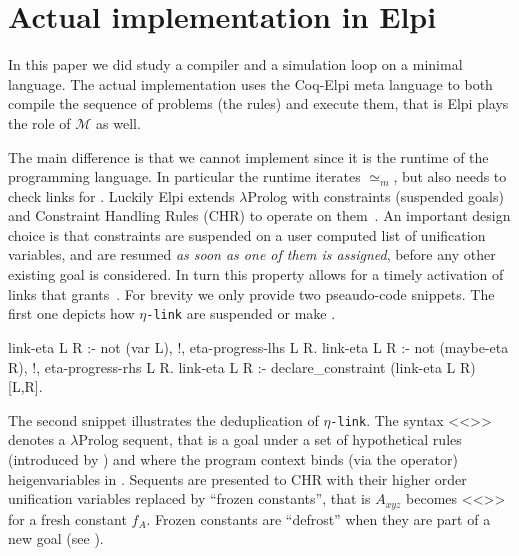 \documentclass[sigconf,natbib=false,review]{acmart}
\newcommand{\UnifRel}{\ensuremath{\simeq}}
\newcommand{\Ue}{\ensuremath{\UnifRel_m}\xspace}
\newcommand{\llambda}{\ensuremath{\mathcal{L}}\xspace}
\newcommand{\linkMacro}[1]{\ensuremath{#1}\texttt{-link}\xspace}
\newcommand{\linketa} {\linkMacro{\eta}}
\newcommand{\Ho}{\texorpdfstring{\ensuremath{\mathcal{M}}\xspace}{M}}
\begin{document}
%
\section{Actual implementation in Elpi}\label{sec:implementation}

In this paper we did study a compiler and a simulation loop on a minimal language.
The actual implementation uses the Coq-Elpi meta language to both compile
the sequence of problems (the rules) and execute them, that is Elpi
plays the role of \Ho{} as well.

The main difference is that we cannot implement \hrun since it is
the runtime of the programming language. In particular the runtime iterates
\Ue, but \hstep also needs to check links for \progress. Luckily Elpi extends
$\lambda$Prolog with constraints (suspended goals) and
Constraint Handling Rules (CHR) to operate on them~\cite{TASSI_2019,fruehwirth2017constraint}.
An important design choice is that constraints are suspended on a user
computed list of unification variables, and are resumed \emph{as soon as one of them
is assigned}, before any other existing goal is considered. In turn this
property allows for a timely activation of links that grants~.
For brevity we only provide two pseaudo-code snippets. The first one depicts
how \linketa are suspended or make \progress.

\begin{elpicode}
link-eta L R :- not (var L), !, eta-progress-lhs L R.
link-eta L R :- not (maybe-eta R), !, eta-progress-rhs L R.
link-eta L R :- declare_constraint (link-eta L R) [L,R].
\end{elpicode}

\noindent
The second snippet illustrates the deduplication of \linketa. The syntax
<<>> denotes a $\lambda$Prolog sequent, that is a 
goal  under a set  of hypothetical rules (introduced
by \elpiIn{=>}) and where the program context binds (via the 
operator) heigenvariables in . Sequents are presented to
CHR with their higher order unification variables replaced by
``frozen constants'', that is $A_{xyz}$ becomes <<>>
for a fresh constant $f_A$. Frozen constants are ``defrost'' when
they are part of a new goal (see \cite[section 4.3]{TASSI_2019}).
\end{document}
